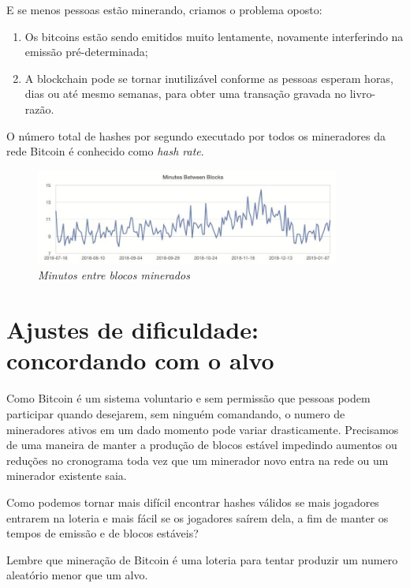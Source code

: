 E se menos pessoas estão minerando, criamos o problema oposto:

\begin{enumerate}
\item Os bitcoins estão sendo emitidos muito lentamente, novamente interferindo na emissão pré-determinada;
\item A blockchain pode se tornar inutilizável conforme as pessoas esperam horas, dias ou até mesmo semanas, para obter uma transação gravada no livro-razão.
\end{enumerate}


O número total de hashes por segundo executado por todos os mineradores da rede Bitcoin é conhecido como \textit{hash rate}.

\begin{figure}[htb]
  \centering
  \includegraphics[width=10cm]{imagens/grafico2-capitulo-05.jpg}
  \caption*{\textit{Minutos entre blocos minerados}}
\end{figure}




\section*{Ajustes de dificuldade: concordando com o alvo}

Como Bitcoin é um sistema voluntario e sem permissão que pessoas podem participar quando desejarem, sem ninguém comandando, o numero de mineradores ativos em um dado momento pode variar drasticamente. Precisamos de uma maneira de manter a produção de blocos estável impedindo aumentos ou reduções no cronograma toda vez que um minerador novo entra na rede ou um minerador existente saia.


Como podemos tornar mais difícil encontrar hashes válidos se mais jogadores entrarem na loteria e mais fácil se os jogadores saírem dela, a fim de manter os tempos de emissão e de blocos estáveis?

Lembre que mineração de Bitcoin é uma loteria para tentar produzir um numero aleatório menor que um alvo.

